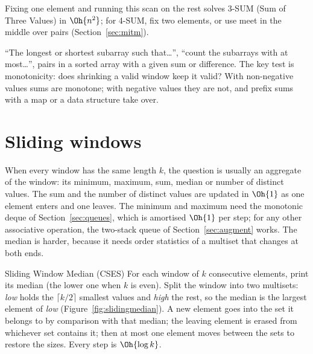 Fixing one element and running this scan on the rest solves 3-SUM (Sum of Three Values) in $\Oh{n^2}$; for 4-SUM, fix two
elements, or use meet in the middle over pairs (Section~\ref{sec:mitm}).

\begin{recognize}
``The longest or shortest subarray such that\ldots'', ``count the subarrays with at most\ldots'', pairs in a sorted array with
a given sum or difference. The key test is monotonicity: does shrinking a valid window keep it valid? With non-negative
values sums are monotone; with negative values they are not, and prefix sums with a map or a data structure take over.
\end{recognize}

\section[Sliding windows]{Sliding windows \hfill \gold}\label{sec:sliding}

When every window has the same length $k$, the question is usually an aggregate of the window: its minimum, maximum, sum,
median or number of distinct values. The sum and the number of distinct values are updated in $\Oh{1}$ as one element enters
and one leaves. The minimum and maximum need the monotonic deque of Section~\ref{sec:queues}, which is amortised $\Oh{1}$ per
step; for any other associative operation, the two-stack queue of Section~\ref{sec:augment} works. The median is harder,
because it needs order statistics of a multiset that changes at both ends.

\begin{problem}{Sliding Window Median (CSES)}
For each window of $k$ consecutive elements, print its median (the lower one when $k$ is even).
\solution Split the window into two multisets: \emph{low} holds the $\lceil k/2 \rceil$ smallest values and \emph{high} the
rest, so the median is the largest element of \emph{low} (Figure~\ref{fig:slidingmedian}). A new element goes into the set
it belongs to by comparison with that median; the leaving element is erased from whichever set contains it; then at most one
element moves between the sets to restore the sizes. Every step is $\Oh{\log k}$.
\end{problem}

